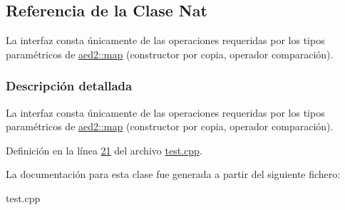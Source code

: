 \hypertarget{classNat}{}\subsection{Referencia de la Clase Nat}
\label{classNat}


La interfaz consta únicamente de las operaciones requeridas por los tipos paramétricos de \hyperlink{classaed2_1_1map}{aed2\+::map} (constructor por copia, operador comparación).  




\subsubsection{Descripción detallada}
La interfaz consta únicamente de las operaciones requeridas por los tipos paramétricos de \hyperlink{classaed2_1_1map}{aed2\+::map} (constructor por copia, operador comparación). 

Definición en la línea \hyperlink{test_8cpp_source_l00021}{21} del archivo \hyperlink{test_8cpp_source}{test.\+cpp}.



La documentación para esta clase fue generada a partir del siguiente fichero\+:\begin{DoxyCompactItemize}
\item 
test.\+cpp\end{DoxyCompactItemize}
